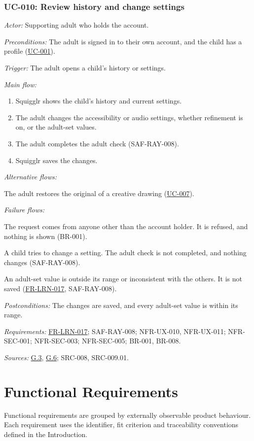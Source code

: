 \documentclass[12pt]{article}
\renewcommand{\_}{\textunderscore\allowbreak}%
\newcommand{\goalref}[1]{\hyperref[goal:#1]{G.#1}}
\newcommand{\ucref}[1]{\hyperref[uc:#1]{\mbox{UC-#1}}}
\newcommand{\reqfield}[2]{\noindent\textit{#1:} #2\par}
\newcommand{\reqref}[1]{\hyperref[req:#1]{#1}}
\providecommand{\ucref}[1]{\hyperref[uc:#1]{UC-#1}}
\begin{document}
\subsubsection{UC-010: Review history and change settings}
\label{puc:010}
\reqfield{Actor}{Supporting adult who holds the account.}
\reqfield{Preconditions}{The adult is signed in to their own account, and the
child has a profile (\ucref{001}).}
\reqfield{Trigger}{The adult opens a child's history or settings.}
\noindent\textit{Main flow:}
\begin{enumerate}[nosep, leftmargin=2.2em]
  \item Squigglr shows the child's history and current settings.
  \item The adult changes the accessibility or audio settings, whether
  refinement is on, or the adult-set values.
  \item The adult completes the adult check (\mbox{SAF-RAY-008}).
  \item Squigglr saves the changes.
\end{enumerate}
\noindent\textit{Alternative flows:}
\begin{description}[nosep, leftmargin=2.2em, font=\normalfont]
  \item[2a.] The adult restores the original of a creative drawing
  (\ucref{007}).
\end{description}
\noindent\textit{Failure flows:}
\begin{description}[nosep, leftmargin=2.2em, font=\normalfont]
  \item[1a.] The request comes from anyone other than the account holder. It is
  refused, and nothing is shown (BR-001).
  \item[3a.] A child tries to change a setting. The adult check is not
  completed, and nothing changes (\mbox{SAF-RAY-008}).
  \item[4a.] An adult-set value is outside its range or inconsistent with the
  others. It is not saved (\mbox{\reqref{FR-LRN-017}}, \mbox{SAF-RAY-008}).
\end{description}
\reqfield{Postconditions}{The changes are saved, and every adult-set value is
within its range.} \reqfield{Requirements}{\mbox{\reqref{FR-LRN-017}};
\mbox{SAF-RAY-008}; NFR-UX-010, NFR-UX-011; NFR-SEC-001; NFR-SEC-003;
NFR-SEC-005; BR-001, BR-008.} \reqfield{Sources}{\goalref{3}, \goalref{6};
\mbox{SRC-008}, \mbox{SRC-009.01}.}
\endgroup

\section{Functional Requirements}
\label{sec:functional}
Functional requirements are grouped by externally observable product behaviour.
Each requirement uses the identifier, fit criterion and traceability conventions
defined in the Introduction.
\end{document}
